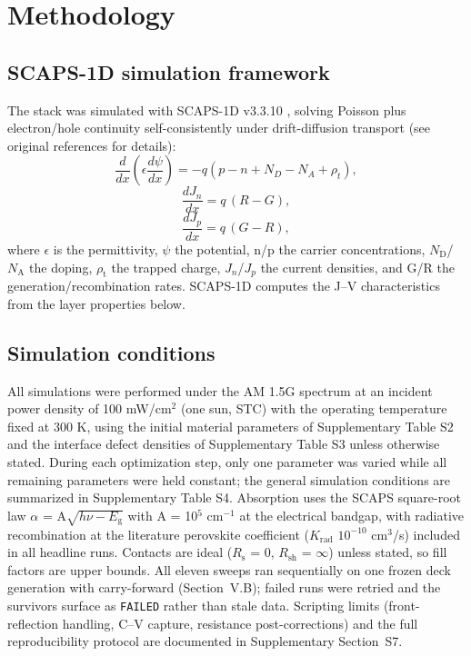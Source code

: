 \documentclass[aip,jap,amsmath,amssymb,preprint]{revtex4-2}
\begin{document}
\section{Methodology}

\subsection{SCAPS-1D simulation framework}
The stack was simulated with SCAPS-1D v3.3.10 \cite{r19,r20}, solving Poisson plus electron/hole continuity self-consistently under drift-diffusion transport (see original references for details):
\begin{equation}\label{eq:poisson}
\frac{d}{dx}\left(\epsilon\frac{d\psi}{dx}\right) =
-q\left(p-n+N_{D}-N_{A}+\rho_{t}\right),
\end{equation}
\begin{equation}\label{eq:electron}
\frac{dJ_{n}}{dx} = q\,(R-G),
\end{equation}
\begin{equation}\label{eq:hole}
\frac{dJ_{p}}{dx} = q\,(G-R),
\end{equation}
where $\epsilon$ is the permittivity, $\psi$ the potential, n/p the carrier concentrations, $N_{\mathrm{D}}$/$N_{\mathrm{A}}$ the doping, $\rho_{\mathrm{t}}$ the trapped charge, $J_{n}$/$J_{p}$ the current densities, and G/R the generation/recombination rates. SCAPS-1D computes the J--V characteristics from the layer properties below.

\subsection{Simulation conditions}
All simulations were performed under the AM 1.5G spectrum at an incident power density of 100 mW/cm$^{2}$ (one sun, STC) with the operating temperature fixed at 300 K, using the initial material parameters of Supplementary Table S2 and the interface defect densities of Supplementary Table S3 unless otherwise stated. During each optimization step, only one parameter was varied while all remaining parameters were held constant; the general simulation conditions are summarized in Supplementary Table S4. Absorption uses the SCAPS square-root law $\alpha$ = A$\sqrt{h\nu-E_{\mathrm{g}}}$ with A = 10$^{5}$ cm$^{-1}$ at the electrical bandgap, with radiative recombination at the literature perovskite coefficient ($K_{\mathrm{rad}}$ $10^{-10}$ cm$^{3}$/s) included in all headline runs. Contacts are ideal ($R_{\mathrm{s}}$ = 0, $R_{\mathrm{sh}}$ = $\infty$) unless stated, so fill factors are upper bounds. All eleven sweeps ran sequentially on one frozen deck generation with carry-forward (Section~V.B); failed runs were retried and the survivors surface as \texttt{FAILED} rather than stale data. Scripting limits (front-reflection handling, C--V capture, resistance post-corrections) and the full reproducibility protocol are documented in Supplementary Section~S7.
\end{document}
